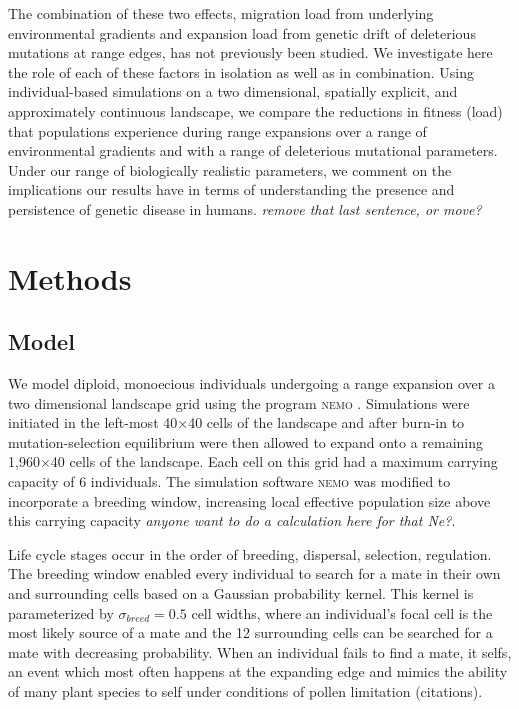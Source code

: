 The combination of these two effects, migration load from underlying environmental gradients and 
expansion load from genetic drift of deleterious mutations at range edges, has not previously been studied. 
We investigate here the role of each of these factors in isolation as well as in combination. 
Using individual-based simulations on a two dimensional, spatially explicit, and approximately continuous 
landscape, we compare the reductions in fitness (load) that populations experience during range expansions 
over a range of environmental gradients and with a range of deleterious mutational parameters. 
Under our range of biologically realistic parameters, we comment on the implications our results have 
in terms of understanding the presence and persistence of genetic disease in humans. \emph{remove that last sentence, or move?}



\section{Methods}

\subsection{Model}

We model diploid, monoecious individuals undergoing a range expansion over a two dimensional 
landscape grid using the program \textsc{nemo} \citep{Guillaume:2006}. Simulations were initiated 
in the left-most 40$\times$40 cells of the landscape and after burn-in to mutation-selection 
equilibrium were then allowed to expand onto a remaining 1,960$\times$40 cells of the landscape. 
Each cell on this grid had a maximum carrying capacity of 6 individuals. The simulation 
software \textsc{nemo} was modified to incorporate a breeding window, increasing local effective 
population size above this carrying capacity \emph{anyone want to do a calculation here for that Ne?}. 

Life cycle stages occur in the order of breeding, dispersal, selection, regulation. The breeding window 
enabled every individual to search for a mate in their own and surrounding cells based on a Gaussian 
probability kernel. This kernel is parameterized by $\sigma_{breed} = 0.5$ cell widths, where an individual's 
focal cell is the most likely source of a mate and the 12 surrounding cells can be searched for a mate 
with decreasing probability. When an individual fails to find a mate, it selfs, an event which most 
often happens at the expanding edge and mimics the ability of many plant species to self under 
conditions of pollen limitation (citations).

